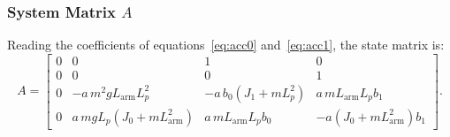 \documentclass[a4paper,11pt]{article}
\newcommand{\La}{L_{\mathrm{arm}}}
\begin{document}
\subsubsection{System Matrix \texorpdfstring{$A$}{A}}
Reading the coefficients of equations~\ref{eq:acc0} and~\ref{eq:acc1}, the state matrix is:
\begin{equation}
\boxed{
A = \begin{bmatrix}
0 & 0 & 1 & 0\\
0 & 0 & 0 & 1\\
0 & -a\, m^2 g \La L_p^2 & -a\, b_0 \left(J_1 + m L_p^2\right) & a\, m \La L_p b_1\\
0 & a\, m g L_p \left(J_0 + m \La^2\right) & a\, m \La L_p b_0 & -a\left(J_0 + m \La^2\right) b_1
\end{bmatrix}.
}
\end{equation}
\end{document}
